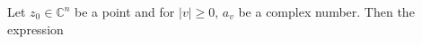 Let $z_0 \in \mathbb{C}^n$ be a point and for $|v| \geqslant 0$, $a_v$ be a complex number. Then the expression
